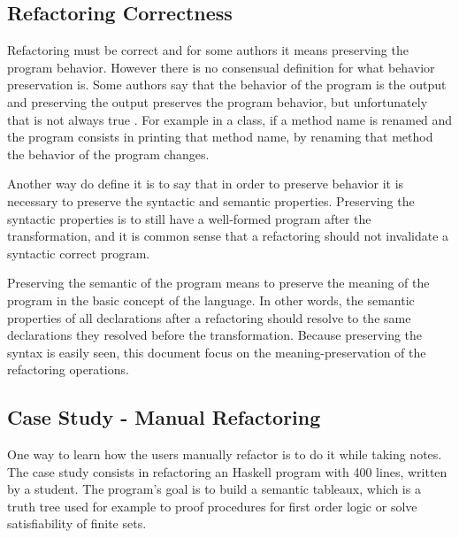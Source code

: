 \subsection{Refactoring Correctness}
Refactoring must be correct and for some authors it means preserving the program behavior.
However there is no consensual definition for what behavior preservation is.
Some authors say that the behavior of the program is the output and preserving the output preserves the program behavior, but unfortunately that is not always true \cite{waite1984compiler}.
For example in a class, if a method name is renamed and the program consists in printing that method name, by renaming that method the behavior of the program changes.

Another way do define it is to say that in order to preserve behavior it is necessary to preserve the syntactic and semantic properties.
Preserving the syntactic properties is to still have a well-formed program after the transformation, and it is common sense that a refactoring should not invalidate a syntactic correct program.

Preserving the semantic of the program means to preserve the meaning of the program in the basic concept of the language. 
In other words, the semantic properties of all declarations after a refactoring should resolve to the same declarations they resolved before the transformation.
Because preserving the syntax is easily seen, this document focus on the meaning-preservation of the refactoring operations. 



\subsection{Case Study - Manual Refactoring}

One way to learn how the users manually refactor is to do it while taking notes.
The case study \cite{thompson2003case} consists in refactoring an Haskell program with 400 lines, written by a student.
The program's goal is to build a semantic tableaux, which is a truth tree used for example to proof procedures for first order logic or solve satisfiability of finite sets.

